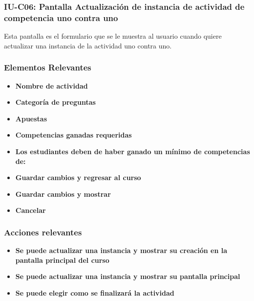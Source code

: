 
\subsubsection{IU-C06: Pantalla Actualización de instancia de actividad de competencia uno contra uno}

 Esta pantalla es el formulario que se le muestra al usuario cuando quiere actualizar una instancia de la actividad uno contra uno.


        \subsubsection{Elementos Relevantes}

            \begin{itemize}
            \item {\bf Nombre de actividad}
            \item {\bf Categoría de preguntas}
            \item {\bf Apuestas}
            \item {\bf Competencias ganadas requeridas}
            \item {\bf Los estudiantes deben de haber ganado un mínimo de competencias de:}
            \item {\bf Guardar cambios y regresar al curso}
            \item {\bf Guardar cambios y mostrar}
            \item {\bf Cancelar}
            \end{itemize}

        \subsubsection{Acciones relevantes}

            \begin{itemize}
            \item {\bf Se puede actualizar una instancia y mostrar su creación en la pantalla principal del curso}
            \item {\bf Se puede actualizar una instancia y mostrar su pantalla principal}
            \item {\bf Se puede elegir como se finalizará la actividad}
            \end{itemize}

        \clearpage
